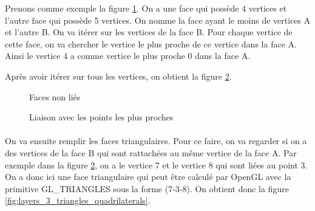 \documentclass[article, backcover, french, nodocumentinfo]{upmethodology-document}
\begin{document}
		Prenons comme exemple la figure \ref{fig:layers_1_empty}. On a une face qui possède 4 vertices et l'autre face qui possède 5 vertices. On nomme la face ayant le moins de vertices A et l'autre B. On va itérer sur les vertices de la face B. Pour chaque vertice de cette face, on va chercher le vertice le plus proche de ce vertice dans la face A. Ainsi le vertice 4 a comme vertice le plus proche 0 dans la face A.
		
		Après avoir itérer sur tous les vertices, on obtient la figure \ref{fig:layers_2_nearest_lines}.
		
		\par\noindent\begin{minipage}[t]{\textwidth}
			\centering
			\begin{minipage}[t]{0.49\textwidth}
				\begin{figure}[H]
					\centering%
					\caption{Faces non liés}%
					\label{fig:layers_1_empty}%
				\end{figure}
			\end{minipage}
			\begin{minipage}[t]{0.49\textwidth}
				\begin{figure}[H]
					\centering%
					\caption{Liaison avec les points les plus proches}%
					\label{fig:layers_2_nearest_lines}%
				\end{figure}
			\end{minipage}
		\end{minipage}
		\paragraph{} On va ensuite remplir les faces triangulaires. Pour ce faire, on va regarder si on a des vertices de la face B qui sont rattachées au même vertice de la face A. Par exemple dans la figure \ref{fig:layers_2_nearest_lines}, on a le vertice 7 et le vertice 8 qui sont liées au point 3. On a donc ici une face triangulaire qui peut être calculé par OpenGL avec la primitive GL\_TRIANGLES sous la forme (7-3-8). On obtient donc la figure \ref{fig:layers_3_triangles_quadrilaterals}.
		
\end{document}
